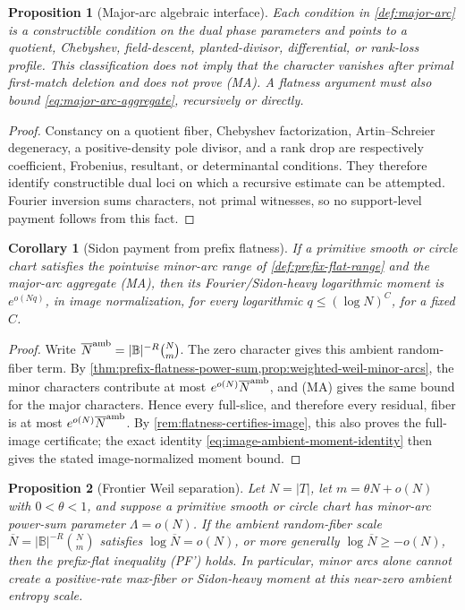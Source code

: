\documentclass[12pt,a4paper]{amsart}
\numberwithin{equation}{section}
\newtheorem{proposition}[proposition]{Proposition}
\newtheorem{corollary}[corollary]{Corollary}
\theoremstyle{remark}
\newcommand{\B}{\mathbb B}
\newcommand{\barN}{\overline N}
\newcommand{\abs}[1]{\lvert #1\rvert}
\begin{document}
\begin{proposition}[Major-arc algebraic interface]\label{prop:major-arcs-are-cells}
Each condition in \cref{def:major-arc} is a constructible condition on the
dual phase parameters and points to a quotient, Chebyshev, field-descent,
planted-divisor, differential, or rank-loss profile.  This classification
does not imply that the character vanishes after primal first-match
deletion and does not prove \textup{(MA)}.  A flatness argument must also
bound \eqref{eq:major-arc-aggregate}, recursively or directly.
\end{proposition}

\begin{proof}
Constancy on a quotient fiber, Chebyshev factorization,
Artin--Schreier degeneracy, a positive-density pole divisor, and a rank
drop are respectively coefficient, Frobenius, resultant, or determinantal
conditions.  They therefore identify constructible dual loci on which a
recursive estimate can be attempted.  Fourier inversion sums characters,
not primal witnesses, so no support-level payment follows from this fact.
\end{proof}

\begin{corollary}[Sidon payment from prefix flatness]\label{cor:sidon-payment-from-prefix-flatness}
If a primitive smooth or circle chart satisfies the pointwise minor-arc
range of \cref{def:prefix-flat-range} and the major-arc aggregate
\textup{(MA)}, then its Fourier/Sidon-heavy logarithmic moment is
\(e^{o(Nq)}\), in image normalization, for every logarithmic
\(q\le(\log N)^C\), for a fixed \(C\).
\end{corollary}

\begin{proof}
Write \(\barN^{\rm amb}=\abs\B^{-R}\binom Nm\).  The zero character gives
this ambient random-fiber term.  By
\cref{thm:prefix-flatness-power-sum,prop:weighted-weil-minor-arcs}, the
minor characters contribute at most \(e^{o(N)}\barN^{\rm amb}\), and
\textup{(MA)} gives the same bound for the major characters.  Hence every
full-slice, and therefore every residual, fiber is at most
\(e^{o(N)}\barN^{\rm amb}\).  By
\cref{rem:flatness-certifies-image}, this also proves the full-image
certificate; the exact identity
\eqref{eq:image-ambient-moment-identity} then gives the stated
image-normalized moment bound.
\end{proof}

\begin{proposition}[Frontier Weil separation]\label{prop:frontier-weil-separation}
Let \(N=\abs T\), let \(m=\theta N+o(N)\) with \(0<\theta<1\), and suppose a primitive smooth or circle chart has minor-arc power-sum parameter \(\Lambda=o(N)\).  If the ambient random-fiber scale \(\barN=\abs\B^{-R}\binom Nm\) satisfies \(\log\barN=o(N)\), or more generally \(\log\barN\ge -o(N)\), then the prefix-flat inequality \textup{(PF')} holds.  In particular, minor arcs alone cannot create a positive-rate max-fiber or Sidon-heavy moment at this near-zero ambient entropy scale.
\end{proposition}
\end{document}
